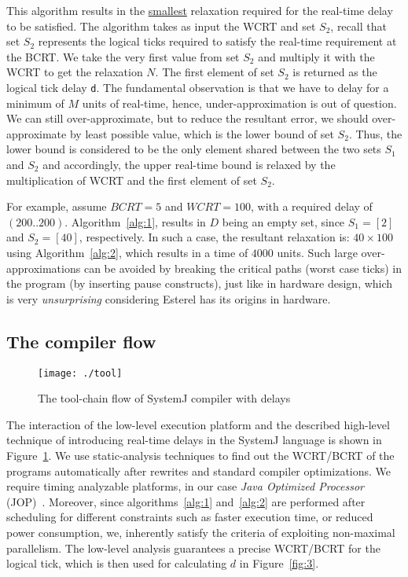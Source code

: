 This algorithm results in the \underline{smallest} relaxation required
for the real-time delay to be satisfied. The algorithm takes as input
the WCRT and set $S_2$, recall that set $S_2$ represents the logical
ticks required to satisfy the real-time requirement at the BCRT. We take
the very first value from set $S_2$ and multiply it with the WCRT to get
the relaxation $N$. The first element of set $S_2$ is returned as the
logical tick delay \texttt{d}. The fundamental observation is that we
have to delay for a minimum of $M$ units of real-time, hence,
under-approximation is out of question. We can still over-approximate,
but to reduce the resultant error, we should over-approximate by least
possible value, which is the lower bound of set $S_2$. Thus, the lower
bound is considered to be the only element shared between the two sets
$S_1$ and $S_2$ and accordingly, the upper real-time bound is relaxed by
the multiplication of WCRT and the first element of set $S_2$.

For example, assume $BCRT=5$ and $WCRT=100$, with a required delay of
$(200..200)$. Algorithm~\ref{alg:1}, results in $D$ being an empty set,
since $S_1=[2]$ and $S_2=[40]$, respectively. In such a case, the
resultant relaxation is: $40 \times 100$ using Algorithm~\ref{alg:2},
which results in a time of $4000$ units. Such large over-approximations
can be avoided by breaking the critical paths (worst case ticks) in the
program (by inserting pause constructs), just like in hardware design,
which is very \textit{unsurprising} considering Esterel has its origins
in hardware.

\subsection{The compiler flow}
\label{sec:systemj-tool-chain}

\begin{figure}[t!]
  \centering
  \texttt{[image: ./tool]}
  \caption{The tool-chain flow of SystemJ compiler with delays}
  \label{fig:4}
\end{figure}

The interaction of the low-level execution platform and the described
high-level technique of introducing real-time delays in the SystemJ
language is shown in Figure~\ref{fig:4}. We use static-analysis
techniques to find out the WCRT/BCRT of the programs automatically after
rewrites and standard compiler optimizations. We require timing
analyzable platforms, in our case \textit{Java Optimized Processor}
(JOP)~\cite{jop:jnl:jsa2007}. Moreover, since algorithms~\ref{alg:1}
and~\ref{alg:2} are performed after scheduling for different constraints
such as faster execution time, or reduced power consumption, we,
inherently satisfy the criteria of exploiting non-maximal
parallelism. The low-level analysis guarantees a precise WCRT/BCRT for
the logical tick, which is then used for calculating $d$ in
Figure~\ref{fig:3}.

